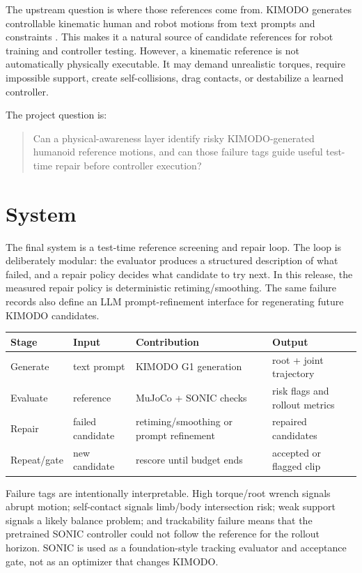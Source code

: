 \documentclass[10pt]{article}
\begin{document}
The upstream question is where those references come from. KIMODO generates
controllable kinematic human and robot motions from text prompts and
constraints \cite{kimodo}. This makes it a natural source of candidate
references for robot training and controller testing. However, a kinematic
reference is not automatically physically executable. It may demand unrealistic
torques, require impossible support, create self-collisions, drag contacts, or
destabilize a learned controller.

The project question is:
\begin{quote}
Can a physical-awareness layer identify risky KIMODO-generated humanoid
reference motions, and can those failure tags guide useful test-time repair
before controller execution?
\end{quote}

\section{System}

The final system is a test-time reference screening and repair loop. The loop is
deliberately modular: the evaluator produces a structured description of what
failed, and a repair policy decides what candidate to try next. In this release,
the measured repair policy is deterministic retiming/smoothing. The same
failure records also define an LLM prompt-refinement interface for regenerating
future KIMODO candidates.

\begin{center}
\begin{tabular}{llll}
\toprule
Stage & Input & Contribution & Output \\
\midrule
Generate & text prompt & KIMODO G1 generation & root + joint trajectory \\
Evaluate & reference & MuJoCo + SONIC checks & risk flags and rollout metrics \\
Repair & failed candidate & retiming/smoothing or prompt refinement & repaired candidates \\
Repeat/gate & new candidate & rescore until budget ends & accepted or flagged clip \\
\bottomrule
\end{tabular}
\end{center}

Failure tags are intentionally interpretable. High torque/root wrench signals
abrupt motion; self-contact signals limb/body intersection risk; weak support
signals a likely balance problem; and trackability failure means that the
pretrained SONIC controller could not follow the reference for the rollout
horizon. SONIC is used as a foundation-style tracking evaluator and acceptance
gate, not as an optimizer that changes KIMODO.
\end{document}

